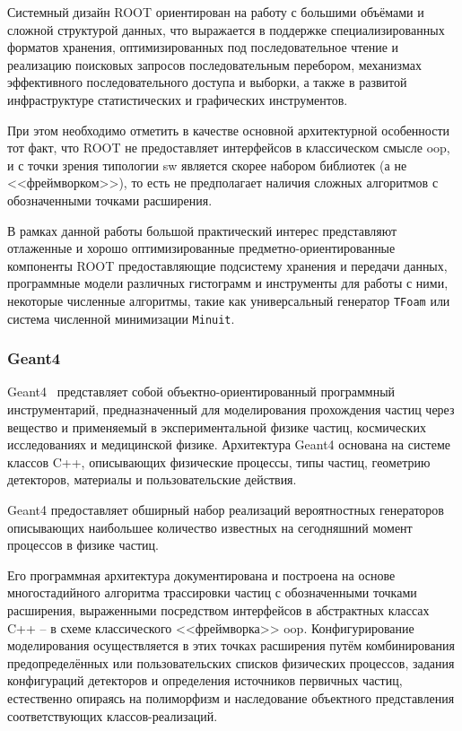 Системный дизайн ROOT ориентирован на работу с большими
объёмами и сложной структурой данных, что выражается в
поддержке специализированных форматов хранения, оптимизированных
под последовательное чтение и реализацию поисковых запросов
последовательным перебором, механизмах
эффективного последовательного доступа и выборки, а также в
развитой инфраструктуре статистических и графических инструментов.

При этом необходимо отметить в качестве основной архитектурной
особенности тот факт, что ROOT не предоставляет интерфейсов в классическом
смысле \acrshort{oop}, и с точки зрения типологии \acrshort{sw}
является скорее набором библиотек (а не <<фреймворком>>), то есть
не предполагает наличия сложных алгоритмов с обозначенными точками
расширения.

В рамках данной работы большой практический интерес
представляют отлаженные и хорошо
оптимизированные предметно-ориентированные компоненты ROOT
предоставляющие подсистему хранения и передачи данных, программные
модели различных гистограмм и инструменты для работы с ними,
некоторые численные алгоритмы, такие как универсальный генератор
\texttt{TFoam} или система численной минимизации \texttt{Minuit}.

\subsubsection{Geant4}

Geant4~\cite{allison-recent-g4-2016} представляет собой
объектно-ориентированный программный инструментарий, предназначенный для
моделирования прохождения частиц через вещество и применяемый в
экспериментальной физике частиц, космических исследованиях и
медицинской физике. Архитектура Geant4 основана на системе классов C++,
описывающих физические процессы, типы частиц, геометрию
детекторов, материалы и пользовательские действия.

Geant4 предоставляет обширный набор реализаций вероятностных
генераторов описывающих наибольшее количество известных на
сегодняшний момент процессов в физике частиц.

Его программная архитектура документирована и построена на основе
многостадийного алгоритма трассировки частиц с обозначенными точками
расширения, выраженными посредством интерфейсов в абстрактных
классах C++ -- в схеме классического <<фреймворка>> \acrshort{oop}.
Конфигурирование моделирования осуществляется в этих точках расширения
путём комбинирования предопределённых или пользовательских списков
физических процессов, задания конфигураций детекторов и определения источников первичных частиц, естественно опираясь на полиморфизм и наследование объектного
представления соответствующих классов-реализаций.

